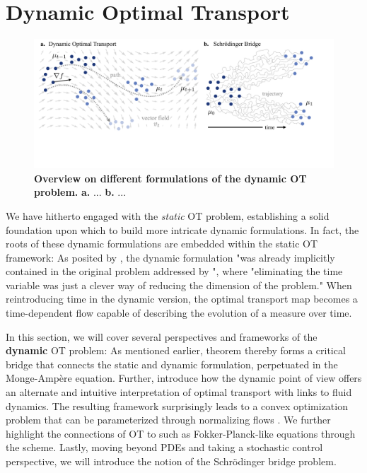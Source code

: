 \section{Dynamic Optimal Transport} \label{sec:background_ot_dynamic}

\begin{figure}[t]
  \includegraphics[width=\textwidth]{figures/fig_dynamic_ot_background.pdf}
  \caption{\textbf{Overview on different formulations of the dynamic OT problem.} \textbf{a.} ... \textbf{b.} ...}	
  \label{fig:dynamic_ot_background}
\end{figure}

We have hitherto engaged with the \emph{static} \acrlong{OT} problem, establishing a solid foundation upon which to build more intricate dynamic formulations. In fact, the roots of these dynamic formulations are embedded within the static \acrshort{OT} framework: As posited by \citet{benamou2000computational}, the dynamic formulation "was already implicitly contained in the original problem addressed by \citeauthor{monge1781histoire}", where "eliminating the time variable was just a clever way of reducing the dimension of the problem." When reintroducing time in the dynamic version, the optimal transport map becomes a time-dependent flow capable of describing the evolution of a measure over time.

In this section, we will cover several perspectives and frameworks of the \textbf{dynamic} \acrshort{OT} problem: As mentioned earlier, \citeauthor{brenier1987decomposition} theorem thereby forms a critical bridge that connects the static and dynamic formulation, perpetuated in the Monge-Amp{\`e}re equation.
Further, \citet*{benamou2000computational} introduce how the dynamic point of view offers an alternate and intuitive interpretation of optimal transport with links to fluid dynamics. The resulting framework surprisingly leads to a convex optimization problem that can be parameterized through normalizing flows \citep{tong2020trajectorynet}.
We further highlight the connections of \acrshort{OT} to  such as Fokker-Planck-like equations through the \citeauthor*{jordan1998variational} scheme.
Lastly, moving beyond PDEs and taking a stochastic control perspective, we will introduce the notion of the Schr\"odinger bridge problem.


